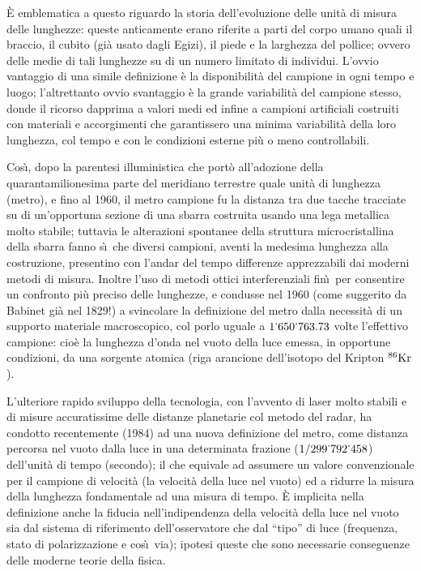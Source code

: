 \`E emblematica a questo riguardo la storia dell'evoluzione
delle unit\`a di misura delle lunghezze: queste anticamente
erano riferite a parti del corpo umano quali il braccio, il
cubito (gi\`a usato dagli Egizi), il piede e la larghezza
del pollice; ovvero delle medie di tali lunghezze su di un
numero limitato di individui.  L'ovvio vantaggio di una
simile definizione \`e la disponibilit\`a del campione in
ogni tempo e luogo; l'altrettanto ovvio svantaggio \`e la
grande variabilit\`a del campione stesso, donde il ricorso
dapprima a valori medi ed infine a campioni artificiali
costruiti con materiali e accorgimenti che garantissero una
minima variabilit\`a della loro lunghezza, col tempo e con
le condizioni esterne pi\`u o meno controllabili.

Cos\`\i, dopo la parentesi illuministica che port\`o
all'adozione della quarantamilionesima parte del meridiano
terrestre quale unit\`a di lunghezza (metro), e fino al
1960, il metro campione fu la distanza tra due tacche
tracciate su di un'opportuna sezione di una sbarra costruita
usando una lega metallica molto stabile; tuttavia le
alterazioni spontanee della struttura microcristallina della
sbarra fanno s\`\i\ che diversi campioni, aventi la medesima
lunghezza alla costruzione, presentino con l'andar del tempo
differenze apprezzabili dai moderni metodi di misura.
Inoltre l'uso di metodi ottici interferenziali fin\`\i \
per consentire un confronto pi\`u preciso delle lunghezze, e
condusse nel 1960 (come suggerito da Babinet gi\`a nel
1829!) a svincolare la definizione del metro dalla
necessit\`a di un supporto materiale macroscopico, col porlo
uguale a $1 \updot 650 \updot 763.73$ volte l'effettivo
campione: cio\`e la lunghezza d'onda nel vuoto della luce
emessa, in opportune condizioni, da una sorgente atomica
(riga arancione dell'isotopo del Kripton $^{86}
\makebox{Kr}$).

L'ulteriore rapido sviluppo della tecnologia, con l'avvento
di laser molto stabili e di misure accuratissime delle
distanze planetarie col metodo del radar, ha condotto
recentemente (1984) ad una nuova definizione del metro, come
distanza percorsa nel vuoto dalla luce in una determinata
frazione ($1 / 299 \updot 792 \updot 458$) dell'unit\`a di
tempo (secondo); il che equivale ad assumere un valore
convenzionale per il campione di velocit\`a (la velocit\`a
della luce nel vuoto) ed a ridurre la misura della lunghezza
fondamentale ad una misura di tempo.  \`E implicita nella
definizione anche la fiducia nell'indipendenza della
velocit\`a della luce nel vuoto sia dal sistema di
riferimento dell'osservatore che dal ``tipo'' di luce
(frequenza, stato di polarizzazione e cos\`\i\ via); ipotesi
queste che sono necessarie conseguenze delle moderne teorie
della fisica.

